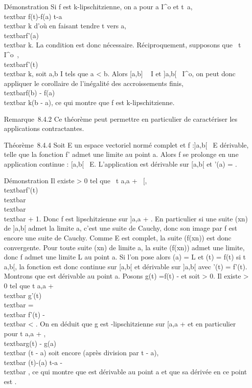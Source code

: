 Démonstration Si f est k-lipschitzienne, on a pour a \in I^o et
t\neq~a, \\textbar{} f(t)-f(a)
\over t-a \\textbar{} \leq k d'où en
faisant tendre t vers a,
\\textbar{}f'(a)\\textbar{} \leq k. La
condition est donc nécessaire. Réciproquement, supposons que
\forall~t \in I^o~,
\\textbar{}f'(t)\\textbar{} \leq k, soit a,b
\in I tels que a \textless{} b. Alors {[}a,b{]} \subset~ I et {]}a,b{[}\subset~
I^o, on peut donc appliquer le corollaire de l'inégalité des
accroissements finis, \\textbar{}f(b) -
f(a)\\textbar{} \leq k(b - a), ce qui montre que f est
k-lipschitzienne.

Remarque~8.4.2 Ce théorème peut permettre en particulier de caractériser
les applications contractantes.

Théorème~8.4.4 Soit E un espace vectoriel normé complet et f :{]}a,b{[}\rightarrow~
E dérivable, telle que la fonction f' admet une limite \ell au point a.
Alors f se prolonge en une application continue
\tildef : {[}a,b{[}\rightarrow~ E. L'application
\tildef est dérivable sur {[}a,b{[} et
\tildef'(a) = \ell.

Démonstration Il existe  \textgreater{} 0 tel que
\forall~t \in{]}a,a + ~{[},
\\textbar{}f'(t)\\textbar{}
\leq\\textbar{} \ell\\textbar{} + 1. Donc f est
lipschitzienne sur {]}a,a + \eta0{[}. En particulier si une suite
(xn) de {]}a,b{[} admet la limite a, c'est une suite de
Cauchy, donc son image par f est encore une suite de Cauchy. Comme E est
complet, la suite (f(xn)) est donc convergente. Pour toute
suite (xn) de limite a, la suite (f(xn)) admet une
limite, donc f admet une limite L au point a. Si l'on pose alors
\tildef(a) = L et \tildef(t) =
f(t) si t \in{]}a,b{[}, la fonction \tildef est donc
continue sur {[}a,b{[} et dérivable sur {]}a,b{[} avec
\tildef'(t) = f'(t). Montrons que
\tildef est dérivable au point a. Posons g(t)
=\tilde f(t) - \ellt et soit \epsilon \textgreater{} 0. Il
existe \eta \textgreater{} 0 tel que t \in{]}a,a +
\eta{[}\rigtharrow~\\textbar{} g'(t)\\textbar{}
=\\textbar{} f'(t) - \ell\\textbar{}
\textless{} \epsilon. On en déduit que g est \epsilon-lipschitzienne sur {[}a,a + \eta{]}
et en particulier pour t \in {[}a,a + \eta{]}, \\textbar{}g(t)
- g(a)\\textbar{} \leq \epsilon(t - a) soit encore (après division
par t - a), \\textbar{}
\tildef(t)-\tildef(a)
\over t-a - \ell\\textbar{} \leq \epsilon, ce qui
montre que \tildef est dérivable au point a et que sa
dérivée en ce point est \ell.

